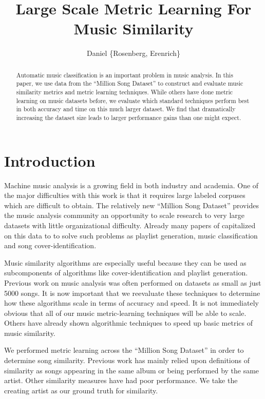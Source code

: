 \documentclass[a4paper,10pt]{article}
\title{Large Scale Metric Learning For Music Similarity}
\author{Daniel \{Rosenberg, Erenrich\} }
\begin{document}
\maketitle

\begin{abstract}
Automatic music classification is an important problem in music analysis. In this paper, we use data from the ``Million Song Dataset'' to construct and evaluate music similarity metrics and metric learning techniques. While others have done metric learning on music datasets before, we evaluate which standard techniques perform best in both accuracy and time on this much larger dataset. We find that dramatically increasing the dataset size leads to larger performance gains than one might expect.
\end{abstract}

\section{Introduction}
Machine music analysis is a growing field in both industry and academia. One of the major difficulties with this work is that it requires large labeled corpuses which are difficult to obtain. The relatively new ``Million Song Dataset'' provides the music analysis community an opportunity to scale research to very large datasets with little organizational difficulty\cite{Bertin-Mahieux2011}. Already many papers of capitalized on this data to to solve such problems as playlist generation\cite{mcfee2011_nlp}, music classification and song cover-identification\cite{Bertin-Mahieux2011b}. 

Music similarity algorithms are especially useful because they can be used as subcomponents of algorithms like cover-identification and playlist generation. Previous work on music analysis was often performed on datasets as small as just 5000 songs\cite{Slaney_learninga}. It is now important that we reevaluate these techniques to determine how these algorithms scale in terms of accuracy and speed. It is not immediately obvious that all of our music metric-learning techniques will be able to scale. Others have already shown algorithmic techniques to speed up basic metrics of music similarity\cite{mcfee2011_sim}.

We performed metric learning across the ``Million Song Dataset'' in order to determine song similarity. Previous work has mainly relied upon definitions of similarity as songs appearing in the same album or being performed by the same artist. Other similarity measures have had poor performance. We take the creating artist as our ground truth for similarity.
\end{document}
